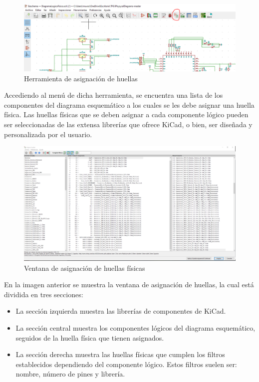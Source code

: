 \begin{figure}[H]
\centering 
\includegraphics[width=1.05\linewidth]{pictures/HerramientaHuellas.PNG}
\caption{Herramienta de asignación de huellas}
\label{fig:kdiagram}
\end{figure}

Accediendo al menú de dicha herramienta, se encuentra una lista de los componentes del diagrama esquemático a los cuales se les debe asignar una huella física. Las huellas físicas que se deben asignar a cada componente lógico pueden ser seleccionadas de las extensa librerías que ofrece KiCad, o bien, ser diseñada y personalizada por el usuario.

\begin{figure}[H]
\centering 
\includegraphics[width=1.05\linewidth]{pictures/AsignarHuellaTriple.PNG}
\caption{Ventana de asignación de huellas físicas}
\label{fig:kdiagram}
\end{figure}

En la imagen anterior se muestra la ventana de asignación de huellas, la cual está dividida en tres secciones:
\begin{itemize}
    \item La sección izquierda muestra las librerías de componentes de KiCad.
    \item La sección central muestra los componentes lógicos del diagrama esquemático, seguidos de la huella física que tienen asignados.
    \item La sección derecha muestra las huellas físicas que cumplen los filtros establecidos dependiendo del componente lógico. Estos filtros suelen ser: nombre, número de pines y librería. 
\end{itemize}

